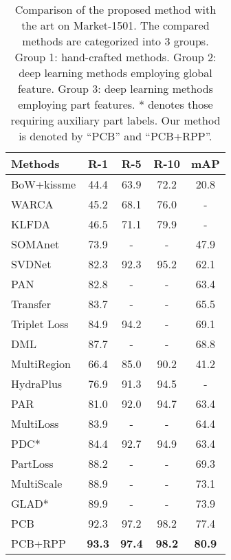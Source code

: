 \documentclass[10pt,twocolumn,letterpaper]{article}
\begin{document}
\setlength{\tabcolsep}{8.3pt}
\begin{table}
\renewcommand\arraystretch{1.1}
\begin{center}
\begin{tabular}{l|cccc}
\hline
Methods &R-1&R-5&R-10&mAP \\
\hline
BoW+kissme \cite{DBLP:conf/iccv/ZhengSTWWT15}  &44.4	&63.9	&72.2  &20.8\\
WARCA\cite{Jose2016Scalable_WARCA}    &45.2	&68.1	&76.0  &-\\
KLFDA\cite{Karanam2016A_KLFDA}  &46.5	&71.1	&79.9  &-\\
\hline
SOMAnet\cite{barbosa2017looking} &73.9&-&-&47.9\\
SVDNet\cite{Sun2017SVDNet} &{82.3}&{92.3}&{95.2}&{62.1}\\
PAN\cite{Zheng2017PAN} &82.8&-&-&63.4\\
Transfer \cite{geng2016deep}  &{83.7}&-&-&{65.5}\\
Triplet Loss \cite{Hermans2017DefenseTriplet}  &84.9	&94.2  &-   &69.1\\
DML  \cite{Zhang2017DeepMutualLearning}      &87.7&-&-&68.8\\

\hline
MultiRegion \cite{Ustinova2015Multiregion}  &66.4	&85.0	&90.2   &41.2\\
HydraPlus \cite{Liu2017HydraPlus} &76.9&91.3&94.5&-\\
PAR \cite{Zhao2017Deeply}   &81.0&92.0&94.7&63.4\\
MultiLoss \cite{Li2017_multiloss} &83.9&-&-&64.4\\
PDC* \cite{Su2017Pose}    &84.4&92.7&94.9&63.4\\
PartLoss \cite{Yao2017Deep}  &88.2&-&-&69.3\\
MultiScale \cite{ChenPerson_multiscale}&88.9&-&-&73.1\\
GLAD* \cite{Wei2017GLAD}         &89.9&-&-&73.9\\

\hline
PCB  &92.3&97.2&98.2&77.4\\
PCB+RPP &\textbf{93.3}&\textbf{97.4}&\textbf{98.2}&\textbf{80.9} \\

\hline
\end{tabular}
\end{center}
\setlength{\abovecaptionskip}{0cm}
\caption{Comparison of the proposed method with the art on Market-1501. The compared methods are categorized into 3 groups. Group 1: hand-crafted methods. Group 2: deep learning methods employing global feature. Group 3: deep learning methods employing part features. * denotes those requiring auxiliary part labels. Our method is denoted by ``PCB'' and ``PCB+RPP''.}
\label{table:cmp_sota_market}
\end{table}
\end{document}
